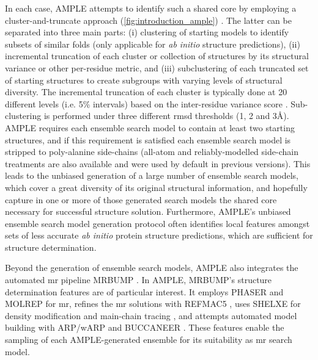 In each case, AMPLE attempts to identify such a shared core by employing a cluster-and-truncate approach (\cref{fig:introduction_ample}) \cite{Bibby2012-lm}. The latter can be separated into three main parts: (i) clustering of starting models to identify subsets of similar folds (only applicable for \textit{ab initio} structure predictions), (ii) incremental truncation of each cluster or collection of structures by its structural variance or other per-residue metric, and (iii) subclustering of each truncated set of starting structures to create subgroups with varying levels of structural diversity. The incremental truncation of each cluster is typically done at 20 different levels (i.e. 5\% intervals) based on the inter-residue variance score \cite{Theobald2006-qj}. Sub-clustering is performed under three different \gls{rmsd} thresholds (1, 2 and 3\AA). AMPLE requires each ensemble search model to contain at least two starting structures, and if this requirement is satisfied each ensemble search model is stripped to poly-alanine side-chains (all-atom and reliably-modelled side-chain \cite{Krivov2009-ex} treatments are also available and were used by default in previous versions). This leads to the unbiased generation of a large number of ensemble search models, which cover a great diversity of its original structural information, and hopefully capture in one or more of those generated search models the shared core necessary for successful structure solution. Furthermore, AMPLE's unbiased ensemble search model generation protocol often identifies local features amongst sets of less accurate \textit{ab initio} protein structure predictions, which are sufficient for structure determination. 

Beyond the generation of ensemble search models, AMPLE also integrates the automated \gls{mr} pipeline MRBUMP \cite{Keegan2018-kn}. In AMPLE, MRBUMP's structure determination features are of particular interest. It employs PHASER \cite{McCoy2007-mp} and MOLREP \cite{Vagin2010-ux} for \gls{mr}, refines the \gls{mr} solutions with REFMAC5 \cite{Murshudov2011-ww}, uses SHELXE for density modification and main-chain tracing \cite{Thorn2013-le}, and attempts automated model building with ARP/wARP \cite{Cohen2008-wg} and BUCCANEER \cite{Cowtan2006-xv}. These features enable the sampling of each AMPLE-generated ensemble for its suitability as \gls{mr} search model.

